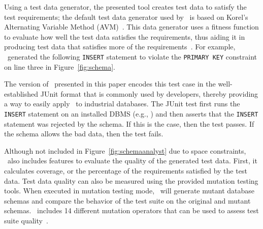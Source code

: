 Using a test data generator, the presented tool creates test data to satisfy the test requirements; the default test
data generator used by \sa~is based on Korel's Alternating Variable Method (AVM)~\cite{Korel:AVM}. This data generator
uses a fitness function to evaluate how well the test data satisfies the requirements, thus aiding it in producing test
data that satisfies more of the requirements~\cite{mcminn2015effectiveness}. For example, \sa~generated the following
\texttt{INSERT} statement to violate the \texttt{PRIMARY KEY} constraint on line three in Figure~\ref{fig:schema}.


\vspace{1ex}

\noindent {}

\vspace{1ex}


The version of \sa~presented in this paper encodes this test case in the well-established JUnit format that is commonly
used by developers, thereby providing a way to easily apply \sa~to industrial databases. The JUnit test first runs the
\texttt{INSERT} statement on an installed DBMS (e.g., \sqlite) and then asserts that the \texttt{INSERT} statement was
rejected by the schema. If this is the case, then the test passes.  If the schema allows the bad data, then the test
fails.




Although not included in Figure~\ref{fig:schemaanalyst} due to space constraints, \sa~also includes features to evaluate
the quality of the generated test data. First, it calculates coverage, or the percentage of the requirements satisfied
by the test data.  Test data quality can also be measured using the provided mutation testing tools. When executed in
mutation testing mode, \sa~will generate mutant database schemas and compare the behavior of the test suite on the
original and mutant schemas. \sa~includes 14 different mutation operators that can be used to assess test suite
quality~\cite{wright2015mutation}.



